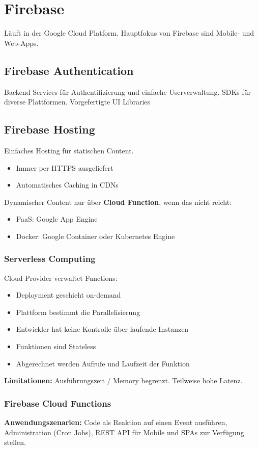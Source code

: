 
\section{Firebase}
Läuft in der Google Cloud Platform.
Hauptfokus von Firebase sind Mobile- und Web-Apps.

\subsection{Firebase Authentication}
Backend Services für Authentifizierung und einfache Userverwaltung.
SDKs für diverse Plattformen.
Vorgefertigte UI Libraries

\subsection{Firebase Hosting}
Einfaches Hosting für statischen Content.
\begin{itemize}
    \item Immer per HTTPS ausgeliefert
    \item Automatisches Caching in CDNs
\end{itemize}
Dynamischer Content nur über \textbf{Cloud Function}, wenn das nicht reicht:
\begin{itemize}
    \item PaaS: Google App Engine
    \item Docker: Google Container oder Kubernetes Engine
\end{itemize}

\subsubsection{Serverless Computing}
Cloud Provider verwaltet Functions:
\begin{itemize}
    \item Deployment geschieht on-demand
    \item Plattform bestimmt die Parallelisierung
    \item Entwickler hat keine Kontrolle über laufende Instanzen
    \item Funktionen sind Stateless
    \item Abgerechnet werden Aufrufe und Laufzeit der Funktion
\end{itemize}
\textbf{Limitationen:} Ausführungszeit / Memory begrenzt.
Teilweise hohe Latenz.

\subsubsection{Firebase Cloud Functions}
\textbf{Anwendungszenarien:} Code als Reaktion auf einen Event ausführen,
Administration (Cron Jobs), REST API für Mobile und SPAs zur Verfügung stellen.

